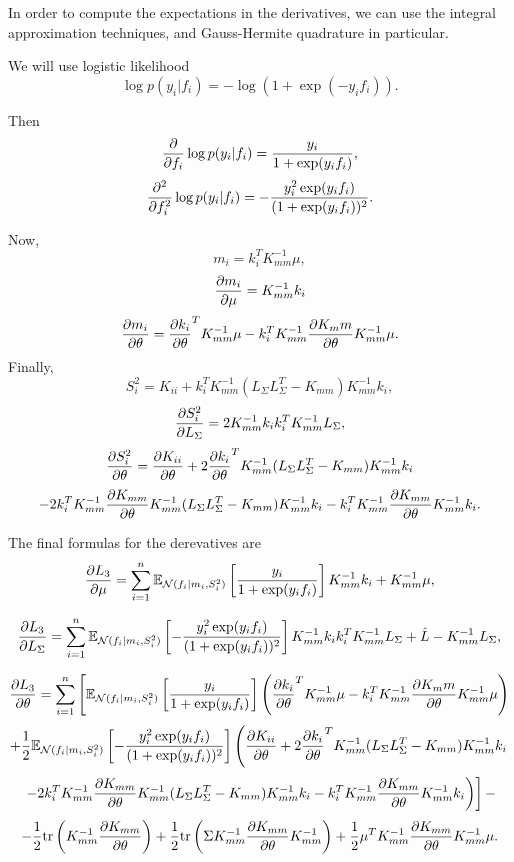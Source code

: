 In order to compute the expectations in the derivatives, we can use the integral approximation techniques, and Gauss-Hermite quadrature in particular.

We will use logistic likelihood
$$\log p(y_i | f_i) =  - \log(1 + \exp( - y_i f_i)).$$

Then
$$\frac{\partial }{\partial f_i} \log p(y_i | f_i) = \frac{y_i}{1 + \exp(y_i f_i)},$$
$$\frac{\partial ^2}{\partial f_i^2} \log p(y_i | f_i) = - \frac{y_i^2 \exp(y_i f_i)}{(1 + \exp(y_i f_i))^2}.$$

Now,
$$m_i = k_i^T K_{mm}^{-1} \mu,$$
$$\frac{\partial m_i}{\partial \mu} = K_{mm}^{-1} k_i$$
$$\frac{\partial m_i}{\partial \theta} = \frac{\partial k_i}{\partial \theta}^T K_{mm}^{-1} \mu - k_i^T K_{mm}^{-1} \frac{\partial K_mm}{\partial \theta} K_{mm}^{-1} \mu.$$
Finally, 
$$S_i^2 = K_{ii} + k_i^T K_{mm}^{-1} (L_\Sigma L_\Sigma^T - K_{mm}) K_{mm}^{-1} k_{i},$$
$$\frac{\partial S_i^2}{\partial L_{\Sigma}} = 2 K_{mm}^{-1} k_i k_i^T K_{mm}^{-1} L_{\Sigma},$$
$$\frac{\partial S_i^2}{\partial \theta} = \frac{\partial K_{ii}}{\partial \theta} + 2 \frac{\partial k_i}{\partial \theta}^T K_{mm}^{-1} (L_\Sigma L_\Sigma^T - K_{mm}) K_{mm}^{-1} k_{i}$$
$$ - 2 k_i^T K_{mm}^{-1} \frac{\partial K_{mm}}{\partial \theta} K_{mm}^{-1} (L_\Sigma L_\Sigma^T - K_{mm}) K_{mm}^{-1} k_{i} - k_i^T K_{mm}^{-1} \frac{\partial K_{mm}}{\partial \theta} K_{mm}^{-1} k_{i}.$$

The final formulas for the derevatives are
$$\frac{\partial L_3}{\partial \mu} = \sum_{i=1}^n \mathbb{E}_{\mathcal{N}(f_i | m_i, S_i^2)}\left[\frac{y_i}{1 + \exp(y_i f_i)}\right] K_{mm}^{-1} k_i + K_{mm}^{-1} \mu,$$

$$\frac{\partial L_3}{\partial L_{\Sigma}} = \sum_{i=1}^n \mathbb{E}_{\mathcal{N}(f_i | m_i, S_i^2)}\left[- \frac{y_i^2 \exp(y_i f_i)}{(1 + \exp(y_i f_i))^2} \right] K_{mm}^{-1} k_i k_i^T K_{mm}^{-1} L_{\Sigma} + \hat L - K_{mm}^{-1} L_{\Sigma},$$

$$\frac{\partial L_3}{\partial \theta} = \sum_{i=1}^n \left[\mathbb{E}_{\mathcal{N}(f_i | m_i, S_i^2)} \left[\frac{y_i}{1 + \exp(y_i f_i)}\right] \left(\frac{\partial k_i}{\partial \theta}^T K_{mm}^{-1} \mu - k_i^T K_{mm}^{-1} \frac{\partial K_mm}{\partial \theta} K_{mm}^{-1} \mu \right)\right.$$
$$ + \frac 1 2 \mathbb{E}_{\mathcal{N}(f_i | m_i, S_i^2)} \left[- \frac{y_i^2 \exp(y_i f_i)}{(1 + \exp(y_i f_i))^2}\right] \left( \frac{\partial K_{ii}}{\partial \theta} + 2 \frac{\partial k_i}{\partial \theta}^T K_{mm}^{-1} (L_\Sigma L_\Sigma^T - K_{mm}) K_{mm}^{-1} k_{i} \right.$$
$$ \left.\left.- 2 k_i^T K_{mm}^{-1} \frac{\partial K_{mm}}{\partial \theta} K_{mm}^{-1} (L_\Sigma L_\Sigma^T - K_{mm}) K_{mm}^{-1} k_{i} - k_i^T K_{mm}^{-1} \frac{\partial K_{mm}}{\partial \theta} K_{mm}^{-1} k_{i} \right)\right]- $$
$$- \frac 1 2 \mbox{tr}\left(K_{mm}^{-1} \frac{\partial K_{mm}}{\partial \theta}\right) + \frac 1 2 \mbox{tr}\left(\Sigma K_{mm}^{-1} \frac{\partial K_{mm}}{\partial \theta} K_{mm}^{-1} \right)+ \frac 1 2 \mu^T K_{mm}^{-1} \frac{\partial K_{mm}}{\partial \theta} K_{mm}^{-1}\mu.$$




